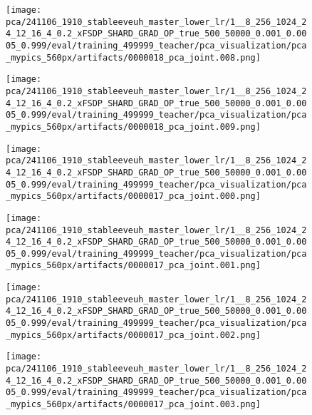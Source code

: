 \begin{figure*}[p]
\begin{subfigure}[t]{0.097\textwidth}
    \end{subfigure}\hfill
    \begin{subfigure}[t]{0.097\textwidth}
        \centering
        \texttt{[image: pca/241106\_1910\_stableeveuh\_master\_lower\_lr/1\_\_8\_256\_1024\_24\_12\_16\_4\_0.2\_xFSDP\_SHARD\_GRAD\_OP\_true\_500\_50000\_0.001\_0.0005\_0.999/eval/training\_499999\_teacher/pca\_visualization/pca\_mypics\_560px/artifacts/0000018\_pca\_joint.008.png]}
    \end{subfigure}\hfill
    \begin{subfigure}[t]{0.097\textwidth}
        \centering
        \texttt{[image: pca/241106\_1910\_stableeveuh\_master\_lower\_lr/1\_\_8\_256\_1024\_24\_12\_16\_4\_0.2\_xFSDP\_SHARD\_GRAD\_OP\_true\_500\_50000\_0.001\_0.0005\_0.999/eval/training\_499999\_teacher/pca\_visualization/pca\_mypics\_560px/artifacts/0000018\_pca\_joint.009.png]}
    \end{subfigure}
    \begin{subfigure}[t]{0.097\textwidth}
        \centering
        \texttt{[image: pca/241106\_1910\_stableeveuh\_master\_lower\_lr/1\_\_8\_256\_1024\_24\_12\_16\_4\_0.2\_xFSDP\_SHARD\_GRAD\_OP\_true\_500\_50000\_0.001\_0.0005\_0.999/eval/training\_499999\_teacher/pca\_visualization/pca\_mypics\_560px/artifacts/0000017\_pca\_joint.000.png]}
    \end{subfigure}\hfill
    \begin{subfigure}[t]{0.097\textwidth}
        \centering
        \texttt{[image: pca/241106\_1910\_stableeveuh\_master\_lower\_lr/1\_\_8\_256\_1024\_24\_12\_16\_4\_0.2\_xFSDP\_SHARD\_GRAD\_OP\_true\_500\_50000\_0.001\_0.0005\_0.999/eval/training\_499999\_teacher/pca\_visualization/pca\_mypics\_560px/artifacts/0000017\_pca\_joint.001.png]}
    \end{subfigure}\hfill
    \begin{subfigure}[t]{0.097\textwidth}
        \centering
        \texttt{[image: pca/241106\_1910\_stableeveuh\_master\_lower\_lr/1\_\_8\_256\_1024\_24\_12\_16\_4\_0.2\_xFSDP\_SHARD\_GRAD\_OP\_true\_500\_50000\_0.001\_0.0005\_0.999/eval/training\_499999\_teacher/pca\_visualization/pca\_mypics\_560px/artifacts/0000017\_pca\_joint.002.png]}
    \end{subfigure}\hfill
    \begin{subfigure}[t]{0.097\textwidth}
        \centering
        \texttt{[image: pca/241106\_1910\_stableeveuh\_master\_lower\_lr/1\_\_8\_256\_1024\_24\_12\_16\_4\_0.2\_xFSDP\_SHARD\_GRAD\_OP\_true\_500\_50000\_0.001\_0.0005\_0.999/eval/training\_499999\_teacher/pca\_visualization/pca\_mypics\_560px/artifacts/0000017\_pca\_joint.003.png]}

\end{subfigure}
\end{figure*}
